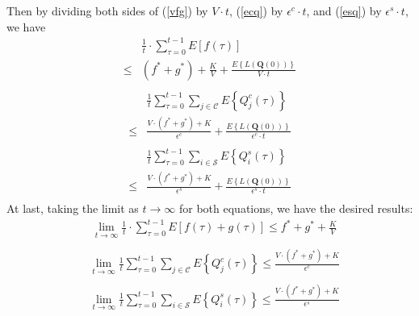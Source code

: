 \documentclass[10pt,journal,compsoc]{IEEEtran}
\begin{document}
Then by dividing both sides of (\ref{vfg}) by $V \cdot t$, (\ref{ecq}) by $\epsilon^c \cdot t$, and (\ref{esq}) by $\epsilon^s \cdot t$, we have
\begin{equation}
	\begin{array}{cl}
		& \displaystyle \frac{1}{t} \cdot \sum_{\tau = 0}^{t-1} E\left[ f(\tau) \right] \\
		\le & \displaystyle (f^* + g^*) + \frac{K}{V} + \frac{E\left\{ L(\mathbf{Q}(0)) \right\}}{V \cdot t} \\
	\end{array}
\end{equation}
\begin{equation}
	\begin{array}{cl}
		& \displaystyle \frac{1}{t} \sum_{\tau = 0}^{t-1} \sum_{j \in \mathcal{C}} E\left\{Q_j^c(\tau)\right\} \\
		\le & \displaystyle \frac{V \cdot (f^* + g^*) + K}{\epsilon^c} + \frac{E\left\{ L(\mathbf{Q}(0)) \right\}}{\epsilon^c \cdot t} \\
	\end{array}
\end{equation}
\begin{equation}
	\begin{array}{cl}
		& \displaystyle \frac{1}{t} \sum_{\tau = 0}^{t-1} \sum_{i \in \mathcal{S}} E\left\{Q_i^s(\tau)\right\} \\
		\le & \displaystyle \frac{V \cdot (f^* + g^*) + K}{\epsilon^s} + \frac{E\left\{ L(\mathbf{Q}(0)) \right\}}{\epsilon^s \cdot t} \\
	\end{array}
\end{equation}
At last, taking the limit as $t \to \infty$ for both equations, we have the desired results:
\begin{equation}
	\begin{array}{cl}
		& \displaystyle \lim_{t \to \infty} \frac{1}{t} \cdot \sum_{\tau = 0}^{t-1} E\left[ f(\tau) + g(\tau) \right] \le \displaystyle f^* + g^* + \frac{K}{V} \\
	\end{array}
\end{equation}
\begin{equation}
	\begin{array}{cl}
		& \displaystyle \lim_{t \to \infty} \frac{1}{t} \sum_{\tau = 0}^{t-1} \sum_{j \in \mathcal{C}} E\left\{Q_j^c(\tau)\right\} \le \frac{V \cdot (f^* + g^*) + K}{\epsilon^c} \\
	\end{array}
\end{equation}
\begin{equation}
	\begin{array}{cl}
		& \displaystyle \lim_{t \to \infty} \frac{1}{t} \sum_{\tau = 0}^{t-1} \sum_{i \in \mathcal{S}} E\left\{Q_i^s(\tau)\right\} \le \frac{V \cdot (f^* + g^*) + K}{\epsilon^s} \\
	\end{array}
\end{equation}
\end{document}
